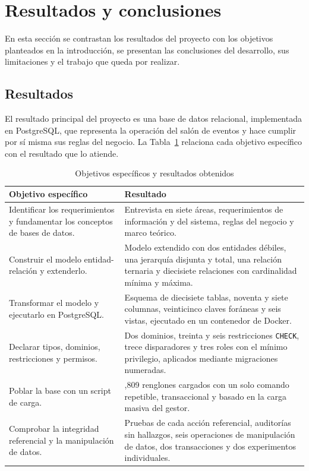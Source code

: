 \newpage

\section{Resultados y conclusiones}
\label{sec:conclusiones}

En esta sección se contrastan los resultados del proyecto con los objetivos planteados en la introducción, se presentan las conclusiones del desarrollo, sus limitaciones y el trabajo que queda por realizar.

\subsection{Resultados}

El resultado principal del proyecto es una base de datos relacional, implementada en PostgreSQL, que representa la operación del salón de eventos y hace cumplir por sí misma sus reglas del negocio. La Tabla~\ref{tab:resultados} relaciona cada objetivo específico con el resultado que lo atiende.

\begin{table}[H]
    \centering
    \small
    \begin{tabularx}{\textwidth}
        {
            >{\RaggedRight\arraybackslash}X
            >{\RaggedRight\arraybackslash}X
        }
        \toprule
        \textbf{Objetivo específico} & \textbf{Resultado} \\
        \midrule
        Identificar los requerimientos y fundamentar los conceptos de bases de datos. & Entrevista en siete áreas, requerimientos de información y del sistema, reglas del negocio y marco teórico. \\
        Construir el modelo entidad-relación y extenderlo. & Modelo extendido con dos entidades débiles, una jerarquía disjunta y total, una relación ternaria y diecisiete relaciones con cardinalidad mínima y máxima. \\
        Transformar el modelo y ejecutarlo en PostgreSQL. & Esquema de diecisiete tablas, noventa y siete columnas, veinticinco claves foráneas y seis vistas, ejecutado en un contenedor de Docker. \\
        Declarar tipos, dominios, restricciones y permisos. & Dos dominios, treinta y seis restricciones \texttt{CHECK}, trece disparadores y tres roles con el mínimo privilegio, aplicados mediante migraciones numeradas. \\
        Poblar la base con un script de carga. & 61,809 renglones cargados con un solo comando repetible, transaccional y basado en la carga masiva del gestor. \\
        Comprobar la integridad referencial y la manipulación de datos. & Pruebas de cada acción referencial, auditorías sin hallazgos, seis operaciones de manipulación de datos, dos transacciones y dos experimentos individuales. \\
        \bottomrule
    \end{tabularx}
    \captionsetup{labelfont=bf, textfont=it, labelsep=newline, justification=raggedright, singlelinecheck=false}
    \caption{Objetivos específicos y resultados obtenidos}
    \label{tab:resultados}
\end{table}

